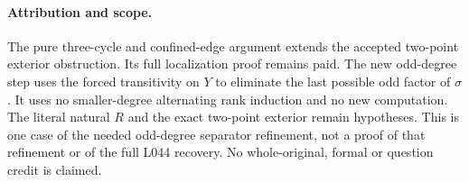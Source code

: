 \documentclass[11pt,a4paper]{article}
\begin{document}
\paragraph{Attribution and scope.}
The pure three-cycle and confined-edge argument extends the
accepted two-point exterior obstruction. Its full localization
proof remains paid. The new odd-degree step uses the forced
transitivity on $Y$ to eliminate the last possible odd factor
of $\sigma$. It uses no smaller-degree alternating rank
induction and no new computation. The literal natural $R$
and the exact two-point exterior remain hypotheses. This is
one case of the needed odd-degree separator refinement, not
a proof of that refinement or of the full L044 recovery.
No whole-original, formal or question credit is claimed.
\end{document}
